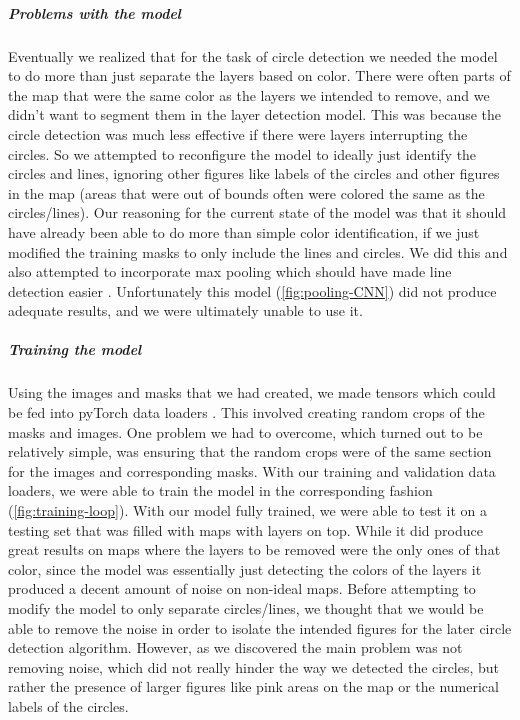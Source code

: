 \documentclass[a4paper,12pt]{extarticle}
\begin{document}
\subparagraph{Problems with the model\\}
Eventually we realized that for the task of circle detection we needed the model to do more than just separate the layers based on color.
There were often parts of the map that were the same color as the layers we intended to remove, and we didn't want to segment them in the layer detection model.
This was because the circle detection was much less effective if there were layers interrupting the circles. So we attempted to reconfigure the model to ideally just identify the circles and lines, ignoring other figures like labels of the circles and other figures in the map (areas that were out of bounds often were colored the same as the circles/lines).
Our reasoning for the current state of the model was that it should have already been able to do more than simple color identification, if we just modified the training masks to only include the lines and circles. We did this and also attempted to incorporate max pooling which should have made line detection easier \cite{cnnsemanticsegmentation}. Unfortunately this model (\cref{fig:pooling-CNN}) did not produce adequate results, and we were ultimately unable to use it.


\subparagraph{Training the model\\}
Using the images and masks that we had created, we made tensors which could be fed into pyTorch data loaders \cite{pytorch}.
This involved creating random crops of the masks and images. One problem we had to overcome, which turned out to be relatively simple, was ensuring that the random crops were of the same section for the images and corresponding masks. With our training and validation data loaders, we were able to train the model in the corresponding fashion (\cref{fig:training-loop}). With our model fully trained, we were able to test it on a testing set that was filled with maps with layers on top. While it did produce great results on maps where the layers to be removed were the only ones of that color, since the model was essentially just detecting the colors of the layers it produced a decent amount of noise on non-ideal maps. Before attempting to modify the model to only separate circles/lines, we thought that we would be able to remove the noise in order to isolate the intended figures for the later circle detection algorithm. However, as we discovered the main problem was not removing noise, which did not really hinder the way we detected the circles, but rather the presence of larger figures like pink areas on the map or the numerical labels of the circles. 
\end{document}
